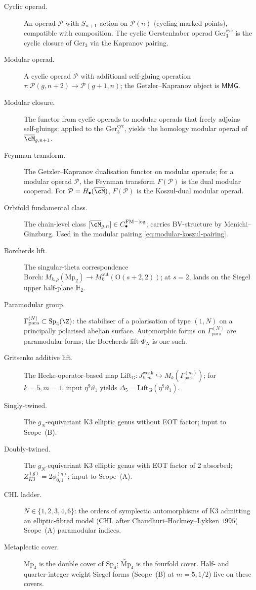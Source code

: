 \begin{description}
\item[Cyclic operad.] An operad $\mathcal{P}$ with $S_{n + 1}$-action
on $\mathcal{P}(n)$ (cycling marked points), compatible with composition.
The cyclic Gerstenhaber operad $\mathrm{Ger}_3^{\mathrm{cyc}}$ is the
cyclic closure of $\mathrm{Ger}_3$ via the Kapranov pairing.
\item[Modular operad.] A cyclic operad $\mathcal{P}$ with additional
self-gluing operation $\tau \colon \mathcal{P}(g, n + 2) \to
\mathcal{P}(g + 1, n)$; the Getzler--Kapranov object is $\mathsf{MMG}$.
\item[Modular closure.] The functor from cyclic operads to modular
operads that freely adjoins self-gluings; applied to the
$\mathrm{Ger}_3^{\mathrm{cyc}}$, yields the homology modular operad
of $\overline{\cM}_{g, n + 1}$.
\item[Feynman transform.] The Getzler--Kapranov dualisation functor
on modular operads; for a modular operad $\mathcal{P}$, the Feynman
transform $F(\mathcal{P})$ is the dual modular cooperad. For
$\mathcal{P} = H_\bullet(\overline{\cM})$, $F(\mathcal{P})$ is the
Koszul-dual modular operad.
\item[Orbifold fundamental class.] The chain-level class
$[\overline{\cM}_{g, n}] \in C_\bullet^{\mathrm{FM-log}}$; carries
BV-structure by Menichi--Ginzburg. Used in the modular pairing
\eqref{eq:modular-koszul-pairing}.
\item[Borcherds lift.] The singular-theta correspondence
$\mathrm{Borch} \colon M_{k, \rho}(\mathrm{Mp}_2) \to
M^{\mathrm{aut}}_k(\mathrm{O}(s + 2, 2))$; at $s = 2$, lands on
the Siegel upper half-plane $\mathbb{H}_2$.
\item[Paramodular group.] $\Gamma^{(N)}_{\mathrm{para}} \subset
\mathrm{Sp}_4(\Z)$: the stabiliser of a polarisation of type $(1, N)$
on a principally polarised abelian surface. Automorphic forms on
$\Gamma^{(N)}_{\mathrm{para}}$ are paramodular forms; the Borcherds
lift $\Phi_N$ is one such.
\item[Gritsenko additive lift.] The Hecke-operator-based map
$\mathrm{Lift}_{\mathrm{G}} \colon J_{k, m}^{\mathrm{weak}}
\hookrightarrow M_k(\Gamma^{(m)}_{\mathrm{para}})$; for $k = 5, m = 1$,
input $\eta^9 \vartheta_1$ yields $\Delta_5 = \mathrm{Lift}_{\mathrm{G}}
(\eta^9 \vartheta_1)$.
\item[Singly-twined.] The $g_N$-equivariant K3 elliptic genus without
EOT factor; input to Scope~(B).
\item[Doubly-twined.] The $g_N$-equivariant K3 elliptic genus with EOT
factor of $2$ absorbed; $Z^{(g)}_{K3} = 2 \phi^{(g)}_{0, 1}$; input to
Scope~(A).
\item[CHL ladder.] $N \in \{1, 2, 3, 4, 6\}$: the orders of symplectic
automorphisms of K3 admitting an elliptic-fibred model (CHL after
Chaudhuri--Hockney--Lykken $1995$). Scope~(A) paramodular indices.
\item[Metaplectic cover.] $\mathrm{Mp}_4$ is the double cover of
$\mathrm{Sp}_4$; $\widetilde{\mathrm{Mp}}_4$ is the fourfold cover.
Half- and quarter-integer weight Siegel forms (Scope~(B) at $m = 5,
1/2$) live on these covers.
\end{description}

